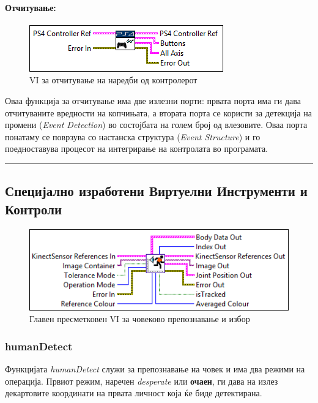 \documentclass[11pt]{article}
\begin{document}
      \paragraph{Отчитување:\\}
        \begin{figure}[H]
	        \includegraphics[width=0.55\linewidth]{./images/controller_read_border.png}
		      \caption{VI за отчитување на наредби од контролерот}
	        \label{fig:controller_read.png}
	        \raggedright
	        \end{figure}
        Оваа функција за отчитување има две излезни порти: првата порта има ги дава отчитуваните вредности на копчињата, а втората порта се користи за детекција на промени (\textit{Event Detection}) во состојбата на голем број од влезовите. Оваа порта понатаму се поврзува со настанска структура (\textit{Event Structure}) и го поедноставува процесот на интегрирање на контролата во програмата.\\
        \textcolor[RGB]{150,150,150}{\rule{\linewidth}{1.6pt}}

  \subsection{Специјално изработени Виртуелни Инструменти и Контроли}
    \label{sec:humanDetect}
	  \begin{figure}[H]
	    \includegraphics[width=0.55\linewidth]{./images/humanDetect_border.png}
		  \caption{Главен пресметковен VI за човеково препознавање и избор}
	    \label{fig:humanDetect.png}
	    \raggedright
	    \end{figure}

    \subsubsection{humanDetect}
      Функцијата \textit{humanDetect} служи за препознавање на човек и има два режими на операција. Првиот режим, наречен \textit{desperate} или \textbf{очаен}, ги дава на излез декартовите координати на првата личност која ќе биде детектирана.
\end{document}
